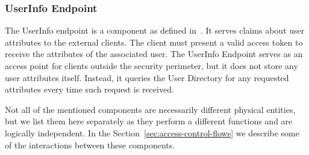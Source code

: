 \subsubsection{UserInfo Endpoint}
The UserInfo endpoint is a component as defined in~\cite{Sakimura2014Final:1}. It serves claims about user attributes to the external clients. The client must present a valid access token to receive the attributes of the associated user. The UserInfo Endpoint serves as an access point for clients outside the security perimeter, but it does not store any user attributes itself. Instead, it queries the User Directory for any requested attributes every time such request is received.

\bigskip \noindent
Not all of the mentioned components are necessarily different physical entities, but we list them here separately as they perform a different functions and are logically independent. In the Section~\ref{sec:access-control-flows} we describe some of the interactions between these components.